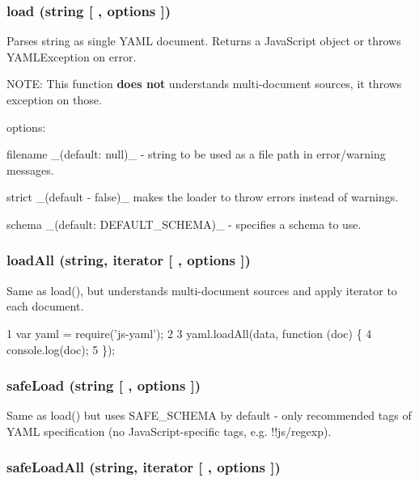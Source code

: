 \subsubsection*{load (string \mbox{[} , options \mbox{]})}

Parses {\ttfamily string} as single Y\+A\+M\+L document. Returns a Java\+Script object or throws {\ttfamily Y\+A\+M\+L\+Exception} on error.

N\+O\+T\+E\+: This function {\bfseries does not} understands multi-\/document sources, it throws exception on those.

options\+:


\begin{DoxyItemize}
\item {\ttfamily filename} \+\_\+(default\+: null)\+\_\+ -\/ string to be used as a file path in error/warning messages.
\item {\ttfamily strict} \+\_\+(default -\/ false)\+\_\+ makes the loader to throw errors instead of warnings.
\item {\ttfamily schema} \+\_\+(default\+: {\ttfamily D\+E\+F\+A\+U\+L\+T\+\_\+\+S\+C\+H\+E\+M\+A})\+\_\+ -\/ specifies a schema to use.
\end{DoxyItemize}

\subsubsection*{load\+All (string, iterator \mbox{[} , options \mbox{]})}

Same as {\ttfamily load()}, but understands multi-\/document sources and apply {\ttfamily iterator} to each document.


\begin{DoxyCode}
1 var yaml = require('js-yaml');
2 
3 yaml.loadAll(data, function (doc) \{
4   console.log(doc);
5 \});
\end{DoxyCode}


\subsubsection*{safe\+Load (string \mbox{[} , options \mbox{]})}

Same as {\ttfamily load()} but uses {\ttfamily S\+A\+F\+E\+\_\+\+S\+C\+H\+E\+M\+A} by default -\/ only recommended tags of Y\+A\+M\+L specification (no Java\+Script-\/specific tags, e.\+g. {\ttfamily !!js/regexp}).

\subsubsection*{safe\+Load\+All (string, iterator \mbox{[} , options \mbox{]})}

